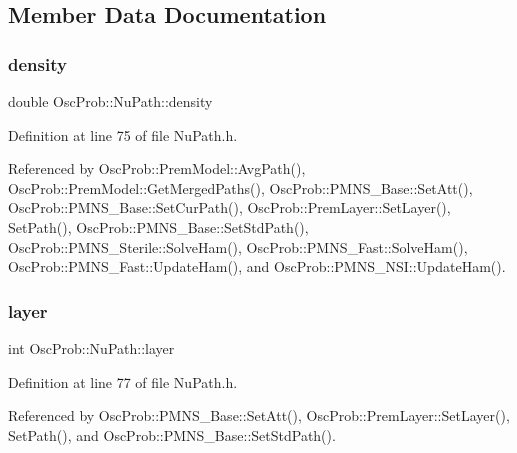 \subsection{Member Data Documentation}
\mbox{\label{structOscProb_1_1NuPath_a54ddd451db69bc54434de3cf18a117ca}} 
\subsubsection{\texorpdfstring{density}{density}}
{\footnotesize\ttfamily double Osc\+Prob\+::\+Nu\+Path\+::density}



Definition at line 75 of file Nu\+Path.\+h.



Referenced by Osc\+Prob\+::\+Prem\+Model\+::\+Avg\+Path(), Osc\+Prob\+::\+Prem\+Model\+::\+Get\+Merged\+Paths(), Osc\+Prob\+::\+P\+M\+N\+S\+\_\+\+Base\+::\+Set\+Att(), Osc\+Prob\+::\+P\+M\+N\+S\+\_\+\+Base\+::\+Set\+Cur\+Path(), Osc\+Prob\+::\+Prem\+Layer\+::\+Set\+Layer(), Set\+Path(), Osc\+Prob\+::\+P\+M\+N\+S\+\_\+\+Base\+::\+Set\+Std\+Path(), Osc\+Prob\+::\+P\+M\+N\+S\+\_\+\+Sterile\+::\+Solve\+Ham(), Osc\+Prob\+::\+P\+M\+N\+S\+\_\+\+Fast\+::\+Solve\+Ham(), Osc\+Prob\+::\+P\+M\+N\+S\+\_\+\+Fast\+::\+Update\+Ham(), and Osc\+Prob\+::\+P\+M\+N\+S\+\_\+\+N\+S\+I\+::\+Update\+Ham().

\mbox{\label{structOscProb_1_1NuPath_a442b160899e554ad1d800989510d5309}} 
\subsubsection{\texorpdfstring{layer}{layer}}
{\footnotesize\ttfamily int Osc\+Prob\+::\+Nu\+Path\+::layer}



Definition at line 77 of file Nu\+Path.\+h.



Referenced by Osc\+Prob\+::\+P\+M\+N\+S\+\_\+\+Base\+::\+Set\+Att(), Osc\+Prob\+::\+Prem\+Layer\+::\+Set\+Layer(), Set\+Path(), and Osc\+Prob\+::\+P\+M\+N\+S\+\_\+\+Base\+::\+Set\+Std\+Path().

